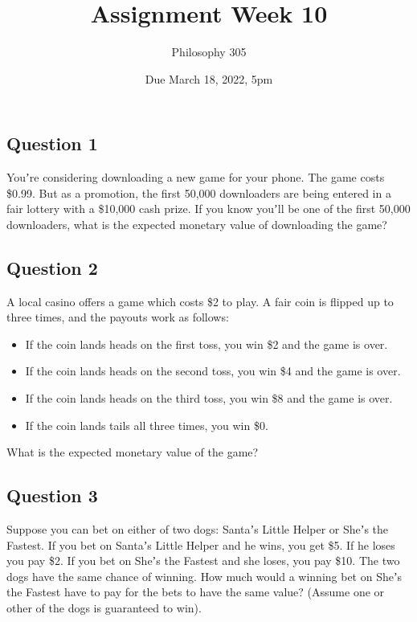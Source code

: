 \documentclass[
  11pt,
]{article}
\title{Assignment Week 10}
\author{Philosophy 305}
\date{Due March 18, 2022, 5pm}
\providecommand{\tightlist}{%
  \setlength{\itemsep}{0pt}\setlength{\parskip}{0pt}}
\begin{document}
\maketitle

\hypertarget{question-1}{%
\subsection{Question 1}\label{question-1}}

Youʼre considering downloading a new game for your phone. The game costs
\$0.99. But as a promotion, the first 50,000 downloaders are being
entered in a fair lottery with a \$10,000 cash prize. If you know youʼll
be one of the first 50,000 downloaders, what is the expected monetary
value of downloading the game?

\hypertarget{question-2}{%
\subsection{Question 2}\label{question-2}}

A local casino offers a game which costs \$2 to play. A fair coin is
flipped up to three times, and the payouts work as follows:

\begin{itemize}
\tightlist
\item
  If the coin lands heads on the first toss, you win \$2 and the game is
  over.
\item
  If the coin lands heads on the second toss, you win \$4 and the game
  is over.
\item
  If the coin lands heads on the third toss, you win \$8 and the game is
  over.
\item
  If the coin lands tails all three times, you win \$0.
\end{itemize}

What is the expected monetary value of the game?

\hypertarget{question-3}{%
\subsection{Question 3}\label{question-3}}

Suppose you can bet on either of two dogs: Santaʼs Little Helper or
Sheʼs the Fastest. If you bet on Santaʼs Little Helper and he wins, you
get \$5. If he loses you pay \$2. If you bet on Sheʼs the Fastest and
she loses, you pay \$10. The two dogs have the same chance of winning.
How much would a winning bet on Sheʼs the Fastest have to pay for the
bets to have the same value? (Assume one or other of the dogs is
guaranteed to win).
\end{document}
